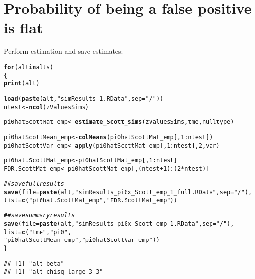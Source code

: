 \documentclass{article}\usepackage[]{graphicx}\usepackage[]{color}
\makeatletter
\newcommand{\hlnum}[1]{\textcolor[rgb]{0.686,0.059,0.569}{#1}}%
\newcommand{\hlstr}[1]{\textcolor[rgb]{0.192,0.494,0.8}{#1}}%
\newcommand{\hlcom}[1]{\textcolor[rgb]{0.678,0.584,0.686}{\textit{#1}}}%
\newcommand{\hlopt}[1]{\textcolor[rgb]{0,0,0}{#1}}%
\newcommand{\hlstd}[1]{\textcolor[rgb]{0.345,0.345,0.345}{#1}}%
\newcommand{\hlkwa}[1]{\textcolor[rgb]{0.161,0.373,0.58}{\textbf{#1}}}%
\newcommand{\hlkwb}[1]{\textcolor[rgb]{0.69,0.353,0.396}{#1}}%
\newcommand{\hlkwc}[1]{\textcolor[rgb]{0.333,0.667,0.333}{#1}}%
\newcommand{\hlkwd}[1]{\textcolor[rgb]{0.737,0.353,0.396}{\textbf{#1}}}%
\newenvironment{kframe}{%
 \def\at@end@of@kframe{}%
 \ifinner\ifhmode%
  \def\at@end@of@kframe{\end{minipage}}%
  \begin{minipage}{\columnwidth}%
 \fi\fi%
 \def\FrameCommand##1{\hskip\@totalleftmargin \hskip-\fboxsep
 \colorbox{shadecolor}{##1}\hskip-\fboxsep
     \hskip-\linewidth \hskip-\@totalleftmargin \hskip\columnwidth}%
 \MakeFramed {\advance\hsize-\width
   \@totalleftmargin\z@ \linewidth\hsize
   \@setminipage}}%
 {\par\unskip\endMakeFramed%
 \at@end@of@kframe}
\newenvironment{knitrout}{}{} %
\makeatother
\begin{document}
\section{Probability of being a false positive is flat}

Perform estimation and save estimates:

\begin{knitrout}
\color{fgcolor}\begin{kframe}
\begin{alltt}
\hlkwa{for}\hlstd{(alt} \hlkwa{in} \hlstd{alts)}
\hlstd{\{}
  \hlkwd{print}\hlstd{(alt)}

  \hlkwd{load}\hlstd{(}\hlkwd{paste}\hlstd{(alt,}\hlstr{"simResults_1.RData"}\hlstd{,}\hlkwc{sep}\hlstd{=}\hlstr{"/"}\hlstd{))}
  \hlstd{ntest} \hlkwb{<-} \hlkwd{ncol}\hlstd{(zValuesSims)}

  \hlstd{pi0hatScottMat_emp} \hlkwb{<-} \hlkwd{estimate_Scott_sims}\hlstd{(zValuesSims, tme, nulltype)}

  \hlstd{pi0hatScottMean_emp} \hlkwb{<-} \hlkwd{colMeans}\hlstd{(pi0hatScottMat_emp[,}\hlnum{1}\hlopt{:}\hlstd{ntest])}
  \hlstd{pi0hatScottVar_emp} \hlkwb{<-} \hlkwd{apply}\hlstd{(pi0hatScottMat_emp[,}\hlnum{1}\hlopt{:}\hlstd{ntest],}\hlnum{2}\hlstd{,var)}

  \hlstd{pi0hat.ScottMat_emp} \hlkwb{<-} \hlstd{pi0hatScottMat_emp[,}\hlnum{1}\hlopt{:}\hlstd{ntest]}
  \hlstd{FDR.ScottMat_emp} \hlkwb{<-} \hlstd{pi0hatScottMat_emp[,(ntest}\hlopt{+}\hlnum{1}\hlstd{)}\hlopt{:}\hlstd{(}\hlnum{2}\hlopt{*}\hlstd{ntest)]}

  \hlcom{##save full results}
  \hlkwd{save}\hlstd{(}\hlkwc{file}\hlstd{=}\hlkwd{paste}\hlstd{(alt,}\hlstr{"simResults_pi0x_Scott_emp_1_full.RData"}\hlstd{,}\hlkwc{sep}\hlstd{=}\hlstr{"/"}\hlstd{),}
       \hlkwc{list}\hlstd{=}\hlkwd{c}\hlstd{(}\hlstr{"pi0hat.ScottMat_emp"}\hlstd{,} \hlstr{"FDR.ScottMat_emp"}\hlstd{))}

  \hlcom{##save summary results}
  \hlkwd{save}\hlstd{(}\hlkwc{file}\hlstd{=}\hlkwd{paste}\hlstd{(alt,}\hlstr{"simResults_pi0x_Scott_emp_1.RData"}\hlstd{,}\hlkwc{sep}\hlstd{=}\hlstr{"/"}\hlstd{),}
       \hlkwc{list}\hlstd{=}\hlkwd{c}\hlstd{(}\hlstr{"tme"}\hlstd{,} \hlstr{"pi0"}\hlstd{,}
            \hlstr{"pi0hatScottMean_emp"}\hlstd{,}\hlstr{"pi0hatScottVar_emp"}\hlstd{))}
\hlstd{\}}
\end{alltt}
\begin{verbatim}
## [1] "alt_beta"
## [1] "alt_chisq_large_3_3"
\end{verbatim}


{\ttfamily\noindent\color{warningcolor}{\#\# Warning in apply(as.matrix(pi0hatScottMat), 2, as.numeric): NAs introduced by coercion}}

{\ttfamily\noindent\bfseries\color{errorcolor}{\#\# Error in apply(as.matrix(pi0hatScottMat), 2, as.numeric): (list) object cannot be coerced to type 'double'}}\end{kframe}
\end{knitrout}
\end{document}

